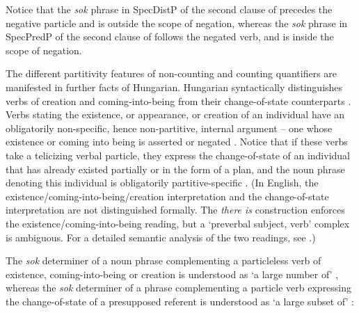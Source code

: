 \documentclass[output=paper]{langscibook}
\begin{document}
\noindent Notice that the \textit{sok} phrase in SpecDistP of the second clause of  precedes the negative particle and is outside the scope of negation, whereas the \textit{sok} phrase in SpecPredP of the second clause of  follows the negated verb, and is inside the scope of negation.

\begin{sloppypar}
The different partitivity features of non-counting and counting quantifiers are manifested in further facts of Hungarian. Hungarian syntactically distinguishes verbs of creation and coming-into-being from their change-of-state counterparts \citep{szabolcsi1986definiteness,pinon08}. Verbs stating the existence, or appearance, or creation of an individual have an obligatorily non-specific, hence non-partitive, internal argument – one whose existence or coming into being is asserted or nega\-ted . Notice that if these verbs take a telicizing verbal particle, they express the change-of-state of an individual that has already existed partially or in the form of a plan, and the noun phrase denoting this individual is obligatorily partitive-specific . (In English, the existence/coming-into-being/creation interpretation and the change-of-state interpretation are not distinguished formally. The \textit{there is} construction enforces the existence/coming-into-being reading, but a ‘preverbal subject, verb’ complex is ambiguous. For a detailed semantic analysis of the two readings, see \citealt{pinon08}.)  
\end{sloppypar}

\eal
{}
\zl

\noindent The \textit{sok} determiner of a noun phrase complementing a particleless verb of existence, coming-into-being or creation is understood as `a large number of' , whereas the \textit{sok} determiner of a phrase complementing a particle verb expressing the change-of-state of a presupposed referent is understood as `a large subset of' :
\end{document}
